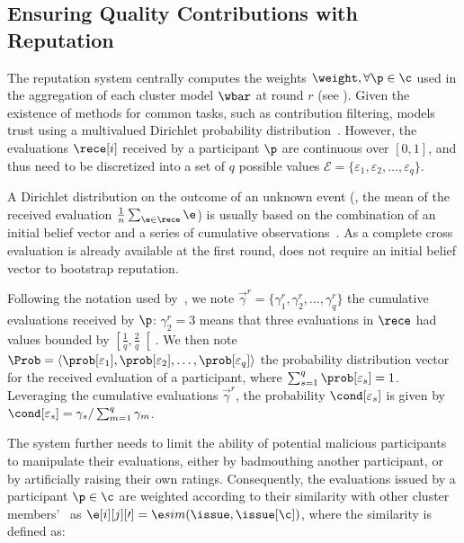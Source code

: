 \subsection{Ensuring Quality Contributions with Reputation\label{sec:radar.archi.reput}}

The reputation system centrally computes the weights $\weight, \forall \p \in \c$ used in the aggregation of each cluster model $\wbar$ at round $r$ (see ).
Given the existence of methods for common tasks, such as contribution filtering, \thecontrib models trust using a multivalued Dirichlet probability distribution~\cite{fung_DirichletBasedTrustManagement_2011}. 
However, the evaluations $\rece[i]$ received by a participant $\p$ are continuous over $[0,1]$, and thus need to be discretized into a set of $q$ possible values $\mathcal{E} = \{\varepsilon_1, \varepsilon_2, \ldots, \varepsilon_q\}$. 

A Dirichlet distribution on the outcome of an unknown event (\ie, the mean of the received evaluation $\frac{1}{n}\sum_{\e \in \rece} \e$) is usually based on the combination of an initial belief vector and a series of cumulative observations~\cite{fung_DirichletBasedTrustManagement_2011}. 
As a complete cross evaluation is already available at the first round, \thecontrib does not require an initial belief vector to bootstrap reputation.

Following the notation used by~\textcite{fung_DirichletBasedTrustManagement_2011}, we note $\vec{\gamma}^r = \{\gamma_{1}^r,\gamma_{2}^r,\ldots,\gamma_{q}^r\}$ the cumulative evaluations received by $\p$: $\gamma_{2}^r=3$ means that three evaluations in $\rece$ had values bounded by $\left[\frac{1}{q},\frac{2}{q}\right[$.
We then note $\Prob = {\langle\prob[\varepsilon_1],\prob[\varepsilon_2], \ldots, \prob[\varepsilon_q]\rangle}$ the probability distribution vector for the received evaluation of a participant, where $\sum_{s=1}^{q}\prob[\varepsilon_s] = 1$.
Leveraging the cumulative evaluations $\vec{\gamma}^r$, the probability $\cond[\varepsilon_s]$ is given by $\cond[\varepsilon_s] = \gamma_{s} / \sum_{m=1}^{q}{\gamma_{m}}$.

The system further needs to limit the ability of potential malicious participants to manipulate their evaluations, either by badmouthing another participant, or by artificially raising their own ratings.
Consequently, the evaluations issued by a participant $\p \in \c$ are weighted according to their similarity with other cluster members'~\cite{xiong_PeerTrustsupportingreputationbased_2004} as $\e[i][j][\prime] = \e sim(\issue,\issue[\c])$, where the similarity is defined as:

